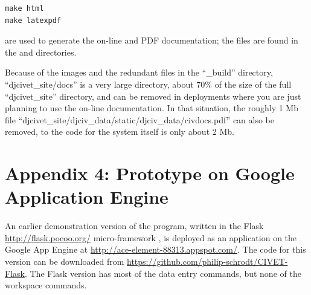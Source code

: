 \documentclass[letterpaper,10pt,english]{sphinxmanual}
\begin{document}
\begin{Verbatim}[commandchars=\\\{\}]
make html
make latexpdf
\end{Verbatim}

are used to generate the on-line and PDF documentation; the files are found in the
 and  directories.

Because of the images and the redundant files in the “\_build” directory,
“djcivet\_site/docs” is a very large directory, about 70\% of the size of the
full “djcivet\_site” directory, and can be removed in deployments where you are
just planning to use the on-line documentation. In that situation, the roughly 1 Mb file
“djcivet\_site/djciv\_data/static/djciv\_data/civdocs.pdf” can also be removed,
to the code for the system itself is only about 2 Mb.


\chapter{Appendix 4: Prototype on Google Application Engine}
\label{appendix4:appendix-4-prototype-on-google-application-engine}\label{appendix4::doc}
An earlier demonstration version of the program, written in the Flask
\href{http://flask.pocoo.org/}{http://flask.pocoo.org/} micro-framework , is deployed as an application on the Google App Engine at
\href{http://ace-element-88313.appspot.com/}{http://ace-element-88313.appspot.com/}.  The code
for this version can be downloaded from \href{https://github.com/philip-schrodt/CIVET-Flask}{https://github.com/philip-schrodt/CIVET-Flask}.
The Flask version has most of the data entry commands, but none of the
workspace commands.
\end{document}
